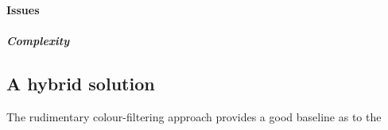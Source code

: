 
\paragraph{Issues}





\subparagraph{Complexity}

\subsection{A hybrid solution}
%
The rudimentary colour-filtering approach provides a good baseline as to the 











